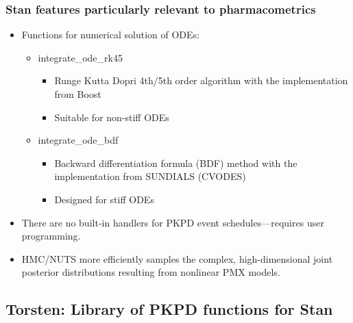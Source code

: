 \documentclass{beamer}
\begin{document}
\begin{frame}
  \frametitle{Stan features particularly relevant to pharmacometrics}
  
  \begin{itemize}
  \item<1-> Functions for numerical solution of ODEs:
    \begin{itemize}
    \item integrate\_ode\_rk45
      \begin{itemize}
      \item Runge Kutta Dopri 4th/5th order algorithm with the
        implementation from Boost
      \item Suitable for non-stiff ODEs
      \end{itemize}
    \item integrate\_ode\_bdf
      \begin{itemize}
      \item Backward differentiation formula (BDF) method with the
        implementation from SUNDIALS (CVODES)
      \item Designed for stiff ODEs
      \end{itemize}
    \end{itemize}
  \item<2-> There are no built-in handlers for PKPD event
    schedules---requires user programming.
  \item<3-> HMC/NUTS more efficiently samples the complex,
    high-dimensional joint posterior distributions resulting from
    nonlinear PMX models.
  \end{itemize}

\end{frame}

\subsection{Torsten: Library of PKPD functions for Stan}
\end{document}
